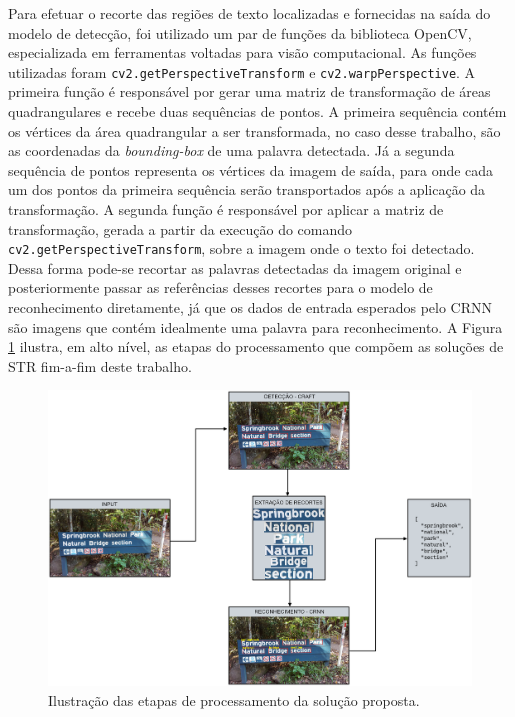 Para efetuar o recorte das regiões de texto localizadas e fornecidas na saída do modelo de detecção, foi utilizado um par de funções da biblioteca 
OpenCV, especializada em ferramentas voltadas para visão computacional. As funções utilizadas foram \texttt{cv2.getPerspectiveTransform} e 
\texttt{cv2.warpPerspective}.
A primeira função é responsável por gerar uma matriz de transformação de áreas quadrangulares e recebe duas sequências de pontos. A primeira 
sequência contém os vértices da área quadrangular a ser transformada, no caso desse trabalho, são as coordenadas da \textit{bounding-box} de uma 
palavra detectada. Já a segunda sequência de pontos representa os vértices da imagem de saída, para onde cada um dos pontos da primeira 
sequência serão transportados após a aplicação da transformação.
A segunda função é responsável por aplicar a matriz de transformação, gerada a partir da execução do comando \texttt{cv2.getPerspectiveTransform}, 
sobre a imagem onde o texto foi detectado. Dessa forma pode-se recortar as palavras detectadas da imagem original e 
posteriormente passar as referências desses recortes para o modelo de reconhecimento diretamente, já que os dados de entrada esperados pelo CRNN 
são imagens que contém idealmente uma palavra para reconhecimento. A Figura \ref{fig:methodology_pipeline} ilustra, em alto nível, as etapas do 
processamento que compõem as soluções de STR fim-a-fim deste trabalho.

\begin{figure}
    \centering
    \includegraphics[width=\textwidth]{figs/metodologia-pipeline.png}
    \caption{Ilustração das etapas de processamento da solução proposta.}
    \label{fig:methodology_pipeline}
\end{figure}

